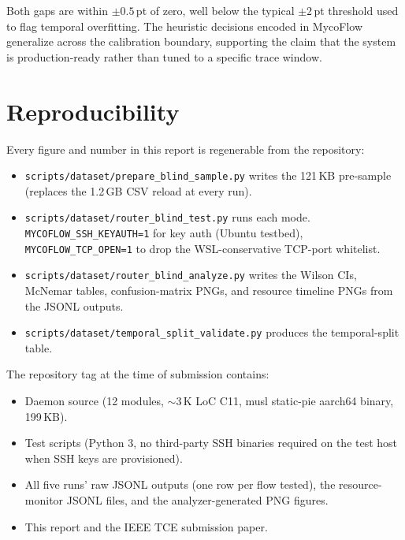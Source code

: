 \documentclass[11pt,a4paper]{article}
\begin{document}
Both gaps are within $\pm 0.5$\,pt of zero, well below the typical
$\pm 2$\,pt threshold used to flag temporal overfitting. The heuristic
decisions encoded in MycoFlow generalize across the calibration
boundary, supporting the claim that the system is production-ready
rather than tuned to a specific trace window.

\section{Reproducibility}

Every figure and number in this report is regenerable from the
repository:
\begin{itemize}
\item \texttt{scripts/dataset/prepare\_blind\_sample.py} writes the
121\,KB pre-sample (replaces the 1.2\,GB CSV reload at every run).
\item \texttt{scripts/dataset/router\_blind\_test.py} runs each mode.
\texttt{MYCOFLOW\_SSH\_KEYAUTH=1} for key auth (Ubuntu testbed),
\texttt{MYCOFLOW\_TCP\_OPEN=1} to drop the WSL-conservative TCP-port
whitelist.
\item \texttt{scripts/dataset/router\_blind\_analyze.py} writes the
Wilson CIs, McNemar tables, confusion-matrix PNGs, and resource
timeline PNGs from the JSONL outputs.
\item \texttt{scripts/dataset/temporal\_split\_validate.py} produces
the temporal-split table.
\end{itemize}

The repository tag at the time of submission contains:
\begin{itemize}
\item Daemon source (12 modules, $\sim$3\,K LoC C11, musl
static-pie aarch64 binary, 199\,KB).
\item Test scripts (Python 3, no third-party SSH binaries required on
the test host when SSH keys are provisioned).
\item All five runs' raw JSONL outputs (one row per flow tested),
the resource-monitor JSONL files, and the analyzer-generated PNG
figures.
\item This report and the IEEE TCE submission paper.
\end{itemize}
\end{document}
